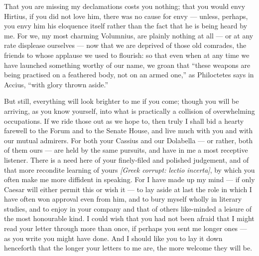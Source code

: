 

 That you are missing my declamations costs you nothing; that you would envy Hirtius, if you did not love him, there was no cause for envy --- unless, perhaps, you envy him his eloquence itself rather than the fact that he is being heard by me. For we, my most charming Volumnius, are plainly nothing at all --- or at any rate displease ourselves --- now that we are deprived of those old comrades, the friends to whose applause we used to flourish: so that even when at any time we have launched something worthy of our name, we groan that ``these weapons are being practised on a feathered body, not on an armed one,'' as Philoctetes says in Accius, ``with glory thrown aside.''

 But still, everything will look brighter to me if you come; though you will be arriving, as you know yourself, into what is practically a collision of overwhelming occupations. If we ride those out as we hope to, then truly I shall bid a hearty farewell to the Forum and to the Senate House, and live much with you and with our mutual admirers. For both your Cassius and our Dolabella --- or rather, both of them ours --- are held by the same pursuits, and have in me a most receptive listener. There is a need here of your finely-filed and polished judgement, and of that more recondite learning of yours \textit{[Greek corrupt: lectio incerta]}, by which you often make me more diffident in speaking. For I have made up my mind --- if only Caesar will either permit this or wish it --- to lay aside at last the role in which I have often won approval even from him, and to bury myself wholly in literary studies, and to enjoy in your company and that of others like-minded a leisure of the most honourable kind. I could wish that you had not been afraid that I might read your letter through more than once, if perhaps you sent me longer ones --- as you write you might have done. And I should like you to lay it down henceforth that the longer your letters to me are, the more welcome they will be.
